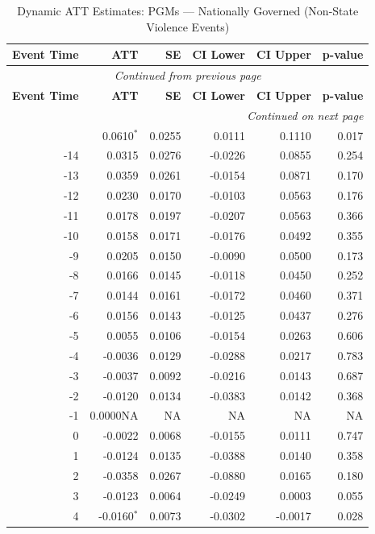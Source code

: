 \begin{longtable}{rrrrrr}
\caption{Dynamic ATT Estimates: PGMs --- Nationally Governed (Non-State Violence Events)} \label{tab:pgms_non_state_violence_events} \\
\toprule
\textbf{Event Time} & \textbf{ATT} & \textbf{SE} & \textbf{CI Lower} & \textbf{CI Upper} & \textbf{p-value} \\
\midrule
\endfirsthead
\multicolumn{6}{c}{\textit{Continued from previous page}} \\
\toprule
\textbf{Event Time} & \textbf{ATT} & \textbf{SE} & \textbf{CI Lower} & \textbf{CI Upper} & \textbf{p-value} \\
\midrule
\endhead
\midrule \multicolumn{6}{r}{\textit{Continued on next page}} \\
\endfoot
\bottomrule
\endlastfoot
-15 & 0.0610$^{*}$ & 0.0255 & 0.0111 & 0.1110 & 0.017 \\
-14 & 0.0315 & 0.0276 & -0.0226 & 0.0855 & 0.254 \\
-13 & 0.0359 & 0.0261 & -0.0154 & 0.0871 & 0.170 \\
-12 & 0.0230 & 0.0170 & -0.0103 & 0.0563 & 0.176 \\
-11 & 0.0178 & 0.0197 & -0.0207 & 0.0563 & 0.366 \\
-10 & 0.0158 & 0.0171 & -0.0176 & 0.0492 & 0.355 \\
-9 & 0.0205 & 0.0150 & -0.0090 & 0.0500 & 0.173 \\
-8 & 0.0166 & 0.0145 & -0.0118 & 0.0450 & 0.252 \\
-7 & 0.0144 & 0.0161 & -0.0172 & 0.0460 & 0.371 \\
-6 & 0.0156 & 0.0143 & -0.0125 & 0.0437 & 0.276 \\
-5 & 0.0055 & 0.0106 & -0.0154 & 0.0263 & 0.606 \\
-4 & -0.0036 & 0.0129 & -0.0288 & 0.0217 & 0.783 \\
-3 & -0.0037 & 0.0092 & -0.0216 & 0.0143 & 0.687 \\
-2 & -0.0120 & 0.0134 & -0.0383 & 0.0142 & 0.368 \\
-1 & 0.0000NA & NA & NA & NA & NA \\
0 & -0.0022 & 0.0068 & -0.0155 & 0.0111 & 0.747 \\
1 & -0.0124 & 0.0135 & -0.0388 & 0.0140 & 0.358 \\
2 & -0.0358 & 0.0267 & -0.0880 & 0.0165 & 0.180 \\
3 & -0.0123 & 0.0064 & -0.0249 & 0.0003 & 0.055 \\
4 & -0.0160$^{*}$ & 0.0073 & -0.0302 & -0.0017 & 0.028 \\

\end{longtable}
